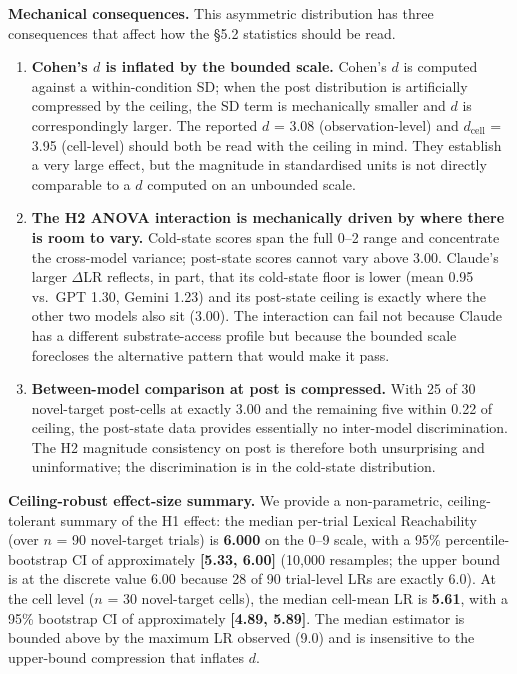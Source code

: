 \documentclass[11pt,a4paper]{article}
\begin{document}
\textbf{Mechanical consequences.} This asymmetric distribution has three consequences that affect how the \S5.2 statistics should be read.

\begin{enumerate}
  \item \textbf{Cohen's $d$ is inflated by the bounded scale.} Cohen's $d$ is computed against a within-condition SD; when the post distribution is artificially compressed by the ceiling, the SD term is mechanically smaller and $d$ is correspondingly larger. The reported $d$ = 3.08 (observation-level) and $d_{\text{cell}}$ = 3.95 (cell-level) should both be read with the ceiling in mind. They establish a very large effect, but the magnitude in standardised units is not directly comparable to a $d$ computed on an unbounded scale.

  \item \textbf{The H2 ANOVA interaction is mechanically driven by where there is room to vary.} Cold-state scores span the full 0--2 range and concentrate the cross-model variance; post-state scores cannot vary above 3.00. Claude's larger $\Delta$LR reflects, in part, that its cold-state floor is lower (mean 0.95 vs.\ GPT 1.30, Gemini 1.23) and its post-state ceiling is exactly where the other two models also sit (3.00). The interaction can fail not because Claude has a different substrate-access profile but because the bounded scale forecloses the alternative pattern that would make it pass.

  \item \textbf{Between-model comparison at post is compressed.} With 25 of 30 novel-target post-cells at exactly 3.00 and the remaining five within 0.22 of ceiling, the post-state data provides essentially no inter-model discrimination. The H2 magnitude consistency on post is therefore both unsurprising and uninformative; the discrimination is in the cold-state distribution.
\end{enumerate}

\textbf{Ceiling-robust effect-size summary.} We provide a non-parametric, ceiling-tolerant summary of the H1 effect: the median per-trial Lexical Reachability (over $n$ = 90 novel-target trials) is \textbf{6.000} on the 0--9 scale, with a 95\% percentile-bootstrap CI of approximately \textbf{[5.33, 6.00]} (10,000 resamples; the upper bound is at the discrete value 6.00 because 28 of 90 trial-level LRs are exactly 6.0). At the cell level ($n$ = 30 novel-target cells), the median cell-mean LR is \textbf{5.61}, with a 95\% bootstrap CI of approximately \textbf{[4.89, 5.89]}. The median estimator is bounded above by the maximum LR observed (9.0) and is insensitive to the upper-bound compression that inflates $d$.
\end{document}
